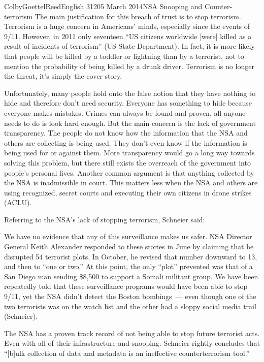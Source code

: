 \documentclass[12pt]{article}
\begin{document}
\begin{mla}{Colby}{Goettel}{Reed}{English 312}{05 March 2014}{NSA Snooping and Counter-terrorism}
The main justification for this breach of trust is to stop terrorism. Terrorism is a huge concern in Americans' minds, especially since the events of 9/11. However, in 2011 only seventeen ``US citizens worldwide [were] killed as a result of incidents of terrorism'' (US State Department). In fact, it is more likely that people will be killed by a toddler or lightning than by a terrorist, not to mention the probability of being killed by a drunk driver. Terrorism is no longer the threat, it's simply the cover story.

Unfortunately, many people hold onto the false notion that they have nothing to hide and therefore don't need security. Everyone has something to hide because everyone makes mistakes. Crimes can always be found and proven, all anyone needs to do is look hard enough. But the main concern is the lack of government transparency. The people do not know how the information that the NSA and others are collecting is being used. They don't even know if the information is being used for or against them. More transparency would go a long way towards solving this problem, but there still exists the overreach of the government into people's personal lives. Another common argument is that anything collected by the NSA is inadmissible in court. This matters less when the NSA and others are using recognized, secret courts and executing their own citizens in drone strikes (ACLU).

Referring to the NSA's lack of stopping terrorism, Schneier said:
\begin{mlaquote}
We have no evidence that any of this surveillance makes us safer. NSA Director General Keith Alexander responded to these stories in June by claiming that he disrupted 54 terrorist plots. In October, he revised that number downward to 13, and then to ``one or two.'' At this point, the only ``plot'' prevented was that of a San Diego man sending \$8,500 to support a Somali militant group. We have been repeatedly told that these surveillance programs would have been able to stop 9/11, yet the NSA didn't detect the Boston bombings~--- even though one of the two terrorists was on the watch list and the other had a sloppy social media trail (Schneier).
\end{mlaquote}
The NSA has a proven track record of not being able to stop future terrorist acts. Even with all of their infrastructure and snooping. Schneier rightly concludes that ``[b]ulk collection of data and metadata is an ineffective counterterrorism tool.''


\end{mla}
\end{document}
